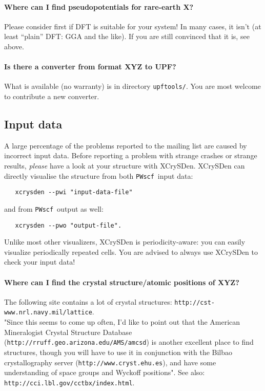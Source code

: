 \documentclass[12pt,a4paper]{article}
\def\PWscf{\texttt{PWscf}}
\begin{document}
\paragraph{Where can I find pseudopotentials for rare-earth X?}

Please consider first if DFT is suitable for your system! In many cases, 
it isn't (at least ``plain'' DFT: GGA and the like). If you are still
convinced that it is, see above.

\paragraph{Is there a converter from format XYZ to UPF?}

What is available (no warranty) is in directory \texttt{upftools/}.
You are most welcome to contribute a new converter.

\subsection{Input data}

A large percentage of the problems reported to the mailing list are
caused by incorrect input data. Before reporting a problem with
strange crashes or strange results, {\em please} have
a look at your structure with XCrySDen. XCrySDen can directly
visualise the structure from both \PWscf\ input data:
\begin{verbatim}
   xcrysden --pwi "input-data-file"
\end{verbatim}
and from \PWscf\ output as well:
\begin{verbatim}
   xcrysden --pwo "output-file".
\end{verbatim}
Unlike most other visualizers, XCrySDen is periodicity-aware: you can
easily visualize periodically repeated cells.
You are advised to always use XCrySDen to check your input data! 

\paragraph{Where can I find the crystal structure/atomic positions of XYZ?}

The following site contains a lot of crystal structures: 
\texttt{http://cst-www.nrl.navy.mil/lattice}.\\
"Since this seems to come up often, I'd like to point out that the
American Mineralogist Crystal Structure Database
(\texttt{http://rruff.geo.arizona.edu/AMS/amcsd}) 
is another excellent place to
find structures, though you will have to use it in conjunction with
the Bilbao crystallography server (\texttt{http://www.cryst.ehu.es}),  
and have some understanding of space groups and Wyckoff positions".
See also:
\texttt{http://cci.lbl.gov/cctbx/index.html}.
\end{document}
